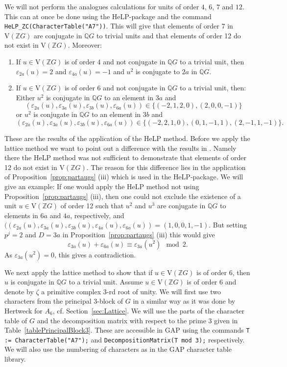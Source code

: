 \documentclass[10pt,a4paper,reqno]{amsart}
\theoremstyle{definition}
\theoremstyle{remark}
\newcommand{\V}{\mathrm{V}}
\newcommand{\ZZ}{\mathbb{Z}}
\newcommand{\QQ}{\mathbb{Q}}
\begin{document}
{We will not perform the analogues calculations for units of order $4$, $6$, $7$ and $12$. This can at once be done using the \textsf{HeLP}-package and the command \texttt{HeLP\_ZC(CharacterTable("A7"))}. This will give that elements of order 7 in $\V(\ZZ G)$ are conjugate in $\QQ G$ to trivial units and that elements of order 12 do not exist in $\V(\ZZ G)$. Moreover:
\begin{enumerate}
\item If $u \in \V(\ZZ G)$ is of order $4$ and not conjugate in $\QQ G$ to a trivial unit, then $\varepsilon_{2a}(u) = 2$ and $\varepsilon_{4a}(u) = -1$ and $u^2$ is conjugate to $2a$ in $\QQ G$.
\item If $u \in \V(\ZZ G)$ is of order $6$ and not conjugate in $\QQ G$ to a trivial unit, then: Either $u^2$ is conjugate in $\QQ G$ to an element in $3a$ and 
$$(\varepsilon_{2a}(u), \varepsilon_{3a}(u), \varepsilon_{3b}(u), \varepsilon_{6a}(u)) \in \{(-2,1,2,0), (2,0,0,-1) \}$$ or $u^2$ is conjugate in $\QQ G$ to an element in $3b$ and 
$$(\varepsilon_{2a}(u), \varepsilon_{3a}(u), \varepsilon_{3b}(u), \varepsilon_{6a}(u)) \in \{(-2,2,1,0), (0,1,-1,1), (2,-1,1,-1) \}.$$
\end{enumerate}

These are the results of the application of the HeLP method. Before we apply the lattice method we want to point out a difference with the results in \cite{Sal11}. Namely there the HeLP method was not sufficient to demonstrate that elements of order 12 do not exist in $\V(\ZZ G)$. The reason for this difference lies in the application of Proposition~\ref{prop:partaugs} (iii) which is used in the \textsf{HeLP}-package. We will give an example: If one would apply the HeLP method not using Proposition~\ref{prop:partaugs} (iii), then one could not exclude the existence of a unit $u \in \V(\ZZ G)$ of order 12 such that $u^2$ and $u^3$ are conjugate in $\QQ G$ to elements in $6a$ and $4a$, respectively, and $((\varepsilon_{2a}(u), \varepsilon_{3a}(u), \varepsilon_{3b}(u), \varepsilon_{4a}(u), \varepsilon_{6a}(u)) = (1,0,0,1,-1)$. But setting $p^j = 2$ and $D = 3a$ in Proposition~\ref{prop:partaugs} (iii) this would give
$$\varepsilon_{3a}(u) + \varepsilon_{6a}(u) \equiv \varepsilon_{3a}(u^2) \mod 2. $$
As $\varepsilon_{3a}(u^2) = 0$, this gives a contradiction.

We next apply the lattice method to show that if $u \in \V(\ZZ G)$ is of order $6$, then $u$ is conjugate in $\QQ G$ to a trivial unit. Assume $u \in \V(\ZZ G)$ is of order $6$ and denote by $\zeta$ a primitive complex $3$-rd root of unity. We will first use two characters from the principal $3$-block of $G$ in a similar way as it was done by Hertweck for $A_6$, cf. Section~\ref{sec:Lattice}.
We will use the parts of the character table of $G$ and the decomposition matrix with respect to the prime $3$ given in Table~\ref{tablePrincipalBlock3}. These are accessible in \textsf{GAP} using the commands \texttt{T := CharacterTable("A7");} and \texttt{DecompositionMatrix(T mod 3);} respectively. We will also use the numbering of characters as in the \textsf{GAP} character table library.

}
\end{document}
